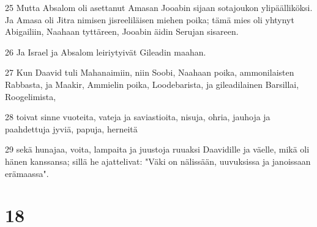 \par 25 Mutta Absalom oli asettanut Amasan Jooabin sijaan sotajoukon ylipäälliköksi. Ja Amasa oli Jitra nimisen jisreeliläisen miehen poika; tämä mies oli yhtynyt Abigailiin, Naahaan tyttäreen, Jooabin äidin Serujan sisareen.
\par 26 Ja Israel ja Absalom leiriytyivät Gileadin maahan.
\par 27 Kun Daavid tuli Mahanaimiin, niin Soobi, Naahaan poika, ammonilaisten Rabbasta, ja Maakir, Ammielin poika, Loodebarista, ja gileadilainen Barsillai, Roogelimista,
\par 28 toivat sinne vuoteita, vateja ja saviastioita, nisuja, ohria, jauhoja ja paahdettuja jyviä, papuja, herneitä
\par 29 sekä hunajaa, voita, lampaita ja juustoja ruuaksi Daavidille ja väelle, mikä oli hänen kanssansa; sillä he ajattelivat: "Väki on nälissään, uuvuksissa ja janoissaan erämaassa".

\chapter{18}

